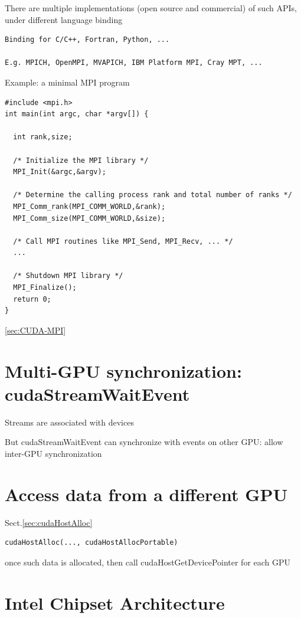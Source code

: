 There are multiple implementations (open source and commercial) of such APIs, under different language binding
\begin{verbatim}
Binding for C/C++, Fortran, Python, ...

E.g. MPICH, OpenMPI, MVAPICH, IBM Platform MPI, Cray MPT, ...
\end{verbatim}

Example: a minimal MPI program
\begin{lstlisting}
#include <mpi.h>
int main(int argc, char *argv[]) {

  int rank,size;

  /* Initialize the MPI library */
  MPI_Init(&argc,&argv);
  
  /* Determine the calling process rank and total number of ranks */
  MPI_Comm_rank(MPI_COMM_WORLD,&rank);
  MPI_Comm_size(MPI_COMM_WORLD,&size);

  /* Call MPI routines like MPI_Send, MPI_Recv, ... */
  ...

  /* Shutdown MPI library */
  MPI_Finalize();
  return 0;
}
\end{lstlisting}

\ref{sec:CUDA-MPI}

\section{Multi-GPU synchronization: cudaStreamWaitEvent}
\label{sec:cudaStreamWaitEvent}

Streams are associated with devices

But cudaStreamWaitEvent can synchronize with events on other GPU: allow
inter-GPU synchronization

\section{Access data from a different GPU}

Sect.\ref{sec:cudaHostAlloc}

\begin{verbatim}
cudaHostAlloc(..., cudaHostAllocPortable)
\end{verbatim}
once such data is allocated, then call cudaHostGetDevicePointer for each GPU


\section{Intel Chipset Architecture}

